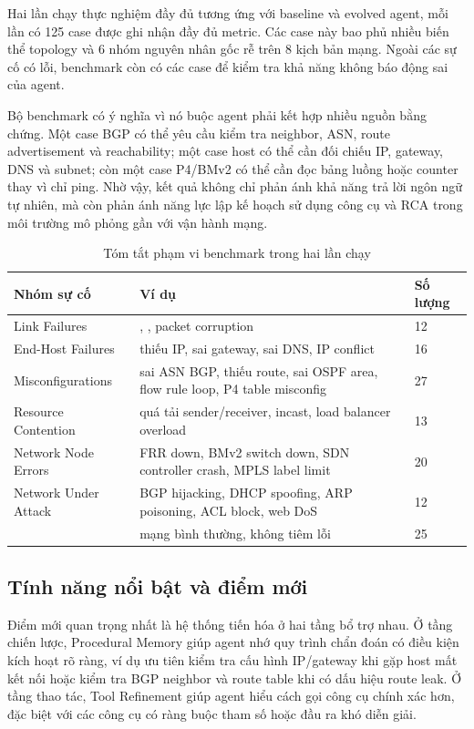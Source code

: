 Hai lần chạy thực nghiệm đầy đủ tương ứng với baseline và evolved agent, mỗi lần có 125 case được ghi nhận đầy đủ metric. Các case này bao phủ nhiều biến thể topology và 6 nhóm nguyên nhân gốc rễ trên 8 kịch bản mạng. Ngoài các sự cố có lỗi, benchmark còn có các case  để kiểm tra khả năng không báo động sai của agent.

Bộ benchmark có ý nghĩa vì nó buộc agent phải kết hợp nhiều nguồn bằng chứng. Một case BGP có thể yêu cầu kiểm tra neighbor, ASN, route advertisement và reachability; một case host có thể cần đối chiếu IP, gateway, DNS và subnet; còn một case P4/BMv2 có thể cần đọc bảng luồng hoặc counter thay vì chỉ ping. Nhờ vậy, kết quả không chỉ phản ánh khả năng trả lời ngôn ngữ tự nhiên, mà còn phản ánh năng lực lập kế hoạch sử dụng công cụ và RCA trong môi trường mô phỏng gần với vận hành mạng.

\begin{table}[t]
\centering
\small
\caption{Tóm tắt phạm vi benchmark trong hai lần chạy}
\begin{tabularx}{\textwidth}{@{}p{3.4cm}Yp{2.2cm}@{}}
\toprule
\textbf{Nhóm sự cố} & \textbf{Ví dụ} & \textbf{Số lượng} \\
\midrule
Link Failures & , , packet corruption & 12 \\
End-Host Failures & thiếu IP, sai gateway, sai DNS, IP conflict & 16 \\
Misconfigurations & sai ASN BGP, thiếu route, sai OSPF area, flow rule loop, P4 table misconfig & 27 \\
Resource Contention & quá tải sender/receiver, incast, load balancer overload & 13 \\
Network Node Errors & FRR down, BMv2 switch down, SDN controller crash, MPLS label limit & 20 \\
Network Under Attack & BGP hijacking, DHCP spoofing, ARP poisoning, ACL block, web DoS & 12 \\
 & mạng bình thường, không tiêm lỗi & 25 \\
\bottomrule
\end{tabularx}
\end{table}

\subsection{Tính năng nổi bật và điểm mới}

Điểm mới quan trọng nhất là hệ thống tiến hóa ở hai tầng bổ trợ nhau. Ở tầng chiến lược, Procedural Memory giúp agent nhớ quy trình chẩn đoán có điều kiện kích hoạt rõ ràng, ví dụ ưu tiên kiểm tra cấu hình IP/gateway khi gặp host mất kết nối hoặc kiểm tra BGP neighbor và route table khi có dấu hiệu route leak. Ở tầng thao tác, Tool Refinement giúp agent hiểu cách gọi công cụ chính xác hơn, đặc biệt với các công cụ có ràng buộc tham số hoặc đầu ra khó diễn giải.


